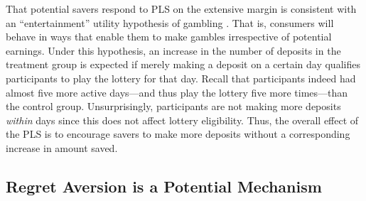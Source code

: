 \documentclass[12pt]{article}
\begin{document}
		That potential savers respond to PLS on the extensive margin is consistent with an ``entertainment'' utility hypothesis of gambling . That is, consumers will behave in ways that enable them to make gambles irrespective of potential earnings. Under this hypothesis, an increase in the number of deposits in the treatment group is expected if merely making a deposit on a certain day qualifies participants to play the lottery for that day. Recall that participants indeed had almost five more active days---and thus play the lottery five more times---than the control group. Unsurprisingly, participants are not making more deposits \textit{within} days since this does not affect lottery eligibility. Thus, the overall effect of the PLS is to encourage savers to make more deposits without a corresponding increase in amount saved.





	\subsection{Regret Aversion is a Potential Mechanism}
\end{document}
